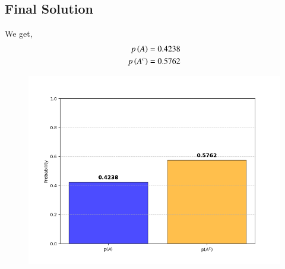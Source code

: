 \documentclass[journal]{IEEEtran}
\begin{document}
	\subsection*{Final Solution}
	We get,
    \begin{align}
        p\left(A\right)=0.4238 \\
        p\left(A^c\right)=0.5762
    \end{align}

\begin{figure}[h]
    \centering
    \includegraphics[width=\columnwidth]{figs/Figure_1.png}
    \label{fig:Plot}
    \end{figure}
\end{document}
